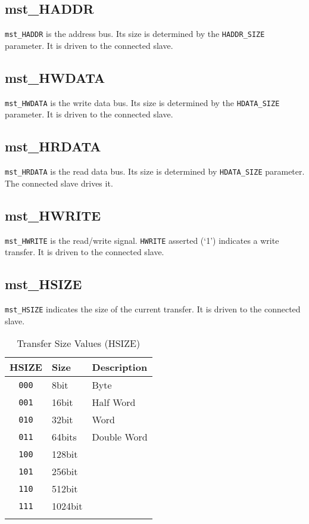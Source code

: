 \subsection{mst\_HADDR}\label{mst_haddr}

\texttt{mst\_HADDR} is the address bus. Its size is determined by the \texttt{HADDR\_SIZE}
parameter. It is driven to the connected slave.

\subsection{mst\_HWDATA}\label{mst_hwdata}

\texttt{mst\_HWDATA} is the write data bus. Its size is determined by the
\texttt{HDATA\_SIZE} parameter. It is driven to the connected slave.

\subsection{mst\_HRDATA}\label{mst_hrdata}

\texttt{mst\_HRDATA} is the read data bus. Its size is determined by \texttt{HDATA\_SIZE}
parameter. The connected slave drives it.

\subsection{mst\_HWRITE}\label{mst_hwrite}

\texttt{mst\_HWRITE} is the read/write signal. \texttt{HWRITE} asserted (`1') indicates a
write transfer. It is driven to the connected slave.

\subsection{mst\_HSIZE}\label{mst_hsize}

\texttt{mst\_HSIZE} indicates the size of the current transfer. It is driven to
the connected slave.

\begin{longtable}[]{@{}cll@{}}
\toprule
HSIZE & Size & Description\tabularnewline
\midrule
\endhead
\texttt{000} & 8bit    & Byte\tabularnewline
\texttt{001} & 16bit   & Half Word\tabularnewline
\texttt{010} & 32bit   & Word\tabularnewline
\texttt{011} & 64bits  & Double Word\tabularnewline
\texttt{100} & 128bit  & \tabularnewline
\texttt{101} & 256bit  & \tabularnewline
\texttt{110} & 512bit  & \tabularnewline
\texttt{111} & 1024bit & \tabularnewline
\bottomrule
\caption{Transfer Size Values (HSIZE)}
\end{longtable}


